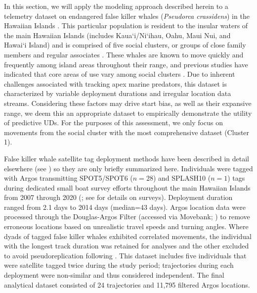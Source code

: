 \documentclass[12pt]{article}
\begin{document}
In this section, we will apply the modeling approach described herein to a telemetry dataset on endangered false killer whales (\emph{Pseudorca crassidens}) in the Hawaiian Islands \citep{baird2016lives}. This particular population is resident to the insular waters of the main Hawaiian Islands (includes Kaua`i/Ni`ihau, Oahu, Maui Nui, and Hawai`i Island) and is comprised of five social clusters, or groups of close family members and regular associates \citep{baird2008false, baird2019cooperative, baird2016lives, martien2019fidelity}. These whales are known to move quickly and frequently among island areas throughout their range, and previous studies have indicated that core areas of use vary among social clusters \citep{baird2010movements, baird2012range, baird2021bringing, baird2016lives}. Due to inherent challenges associated with tracking apex marine predators, this dataset is characterized by variable deployment durations and irregular location data streams. Considering these factors may drive start bias, as well as their expansive range, we deem this an appropriate dataset to empirically demonstrate the utility of predictive UDs. For the purposes of this assessment, we only focus on movements from the social cluster with the most comprehensive dataset (Cluster 1). 

False killer whale satellite tag deployment methods have been described in detail elsewhere (see \citealt{baird2010movements, baird2012range}) so they are only briefly summarized here. Individuals were tagged with Argos transmitting SPOT5/SPOT6 ($n=28$) and SPLASH10 ($n=1$) tags during dedicated small boat survey efforts throughout the main Hawaiian Islands from 2007 through 2020 (\citealt{baird2012range,baird2021bringing, baird2016lives}; see \citealt{baird2013odontocete} for details on surveys). Deployment duration ranged from 2.1 days to 2014 days (median=43 days). Argos location data were processed through the Douglas-Argos Filter (accessed via Movebank; \citealt{kranstauber2011movebank,douglas2012moderating}) to remove erroneous locations based on unrealistic travel speeds and turning angles. Where dyads of tagged false killer whales exhibited correlated movements, the individual with the longest track duration was retained for analyses and the other excluded to avoid pseudoreplication following \citet{baird2012range}. This dataset includes five individuals that were satellite tagged twice during the study period; trajectories during each deployment were non-similar and thus considered independent. The final analytical dataset consisted of 24 trajectories and 11,795 filtered Argos locations. 
\end{document}
